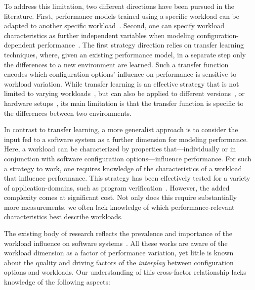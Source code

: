 To address this limitation, two different directions have been pursued in the literature. First, performance models trained using a specific workload can be adapted to another specific workload~\cite{jamishidi_transfer_2017,jamshidi_learning_2018,jamshidi_transfer_gp_2017}. Second,  one can specify workload characteristics as further independent variables when modeling configuration-dependent performance~\cite{koc_satune_2021}.
The first strategy direction relies on transfer learning techniques, where, given an existing performance model, in a separate step only the differences to a new environment are learned. Such a transfer function encodes which configuration options’ influence on performance is sensitive to workload variation. While transfer learning is an effective strategy that is not limited to varying workloads~\cite{jamshidi_learning_2018}, but can also be applied to different versions~\cite{jamishidi_transfer_2017,jamshidi_transfer_gp_2017,martin_transfer_2021}, or hardware setups~\cite{ding_bayesian_2020}, its main limitation is that the transfer function is specific to the differences between two environments.



In contrast to transfer learning, a more generalist approach is to consider the input fed to a software system as a further dimension for modeling performance. Here, a workload can be characterized by properties that---individually or in conjunction with software configuration options---influence performance. For such a strategy to work, one requires knowledge of the characteristics of a workload that influence performance. This strategy has been effectively tested for a  variety of application-domains, such as program verification~\cite{koc_satune_2021}. However, the added complexity comes at significant cost. 
Not only does this require substantially more measurements, we often lack knowledge of which performance-relevant characteristics best describe workloads.


The existing body of research reflects the prevalence and importance of the workload influence on software systems~\cite{khavari_compression_2019,maxiaguine_workload_2004,plotnikov_compilation_2013,ding_compilation_2015,falkner_sat_solvers_2015,satzilla_2008,alves_sampling_2020}. All these works are aware of the workload dimension as a factor of performance variation, yet little is known about the quality and driving factors of the \emph{interplay} between configuration options and workloads. Our understanding of this cross-factor relationship lacks knowledge of the following aspects:


